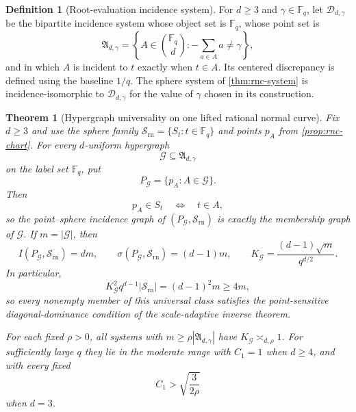 \documentclass[11pt,letterpaper]{amsart}
\newtheorem{theorem}{Theorem}[section]
\theoremstyle{definition}
\newtheorem{definition}[definition]{Definition}
\theoremstyle{remark}
\newcommand{\1}{\mathbf 1}
\begin{document}
\begin{definition}[Root-evaluation incidence system]\label{def:root-system}
For $d\ge3$ and $\gamma\in\mathbb F_q$, let $\mathcal D_{d,\gamma}$ be the bipartite incidence system whose object set is $\mathbb F_q$, whose point set is
\[
 \mathfrak A_{d,\gamma}
 =\left\{A\in\binom{\mathbb F_q}{d}:-\sum_{a\in A}a\ne\gamma\right\},
\]
and in which $A$ is incident to $t$ exactly when $t\in A$.  Its centered discrepancy is defined using the baseline $1/q$.  The sphere system of \cref{thm:rnc-system} is incidence-isomorphic to $\mathcal D_{d,\gamma}$ for the value of $\gamma$ chosen in its construction.
\end{definition}

\begin{theorem}[Hypergraph universality on one lifted rational normal curve]\label{thm:hypergraph-universality}
Fix $d\ge3$ and use the sphere family $\mathcal S_{\mathrm{rn}}=\{S_t:t\in\mathbb F_q\}$ and points $p_A$ from \cref{prop:rnc-chart}.  For every $d$-uniform hypergraph
\[
 \mathcal G\subseteq\mathfrak A_{d,\gamma}
\]
on the label set $\mathbb F_q$, put
\[
 P_{\mathcal G}=\{p_A:A\in\mathcal G\}.
\]
Then
\begin{equation}\label{eq:universality-incidence}
 p_A\in S_t\quad\Longleftrightarrow\quad t\in A,
\end{equation}
so the point--sphere incidence graph of $(P_{\mathcal G},\mathcal S_{\mathrm{rn}})$ is exactly the membership graph of $\mathcal G$.  If $m=|\mathcal G|$, then
\begin{equation}\label{eq:universality-parameters}
 I(P_{\mathcal G},\mathcal S_{\mathrm{rn}})=dm,
 \qquad
 \sigma(P_{\mathcal G},\mathcal S_{\mathrm{rn}})=(d-1)m,
 \qquad
 K_{\mathcal G}=\frac{(d-1)\sqrt m}{q^{d/2}}.
\end{equation}
In particular,
\begin{equation}\label{eq:universality-lower}
 K_{\mathcal G}^2q^{d-1}|\mathcal S_{\mathrm{rn}}|
 =(d-1)^2m\ge4m,
\end{equation}
so every nonempty member of this universal class satisfies the point-sensitive diagonal-dominance condition of the scale-adaptive inverse theorem.

For each fixed $\rho>0$, all systems with $m\ge\rho|\mathfrak A_{d,\gamma}|$ have $K_{\mathcal G}\asymp_{d,\rho}1$.  For sufficiently large $q$ they lie in the moderate range with $C_1=1$ when $d\ge4$, and with every fixed
\[
 C_1>\sqrt{\frac{3}{2\rho}}
\]
when $d=3$.
\end{theorem}
\end{document}
